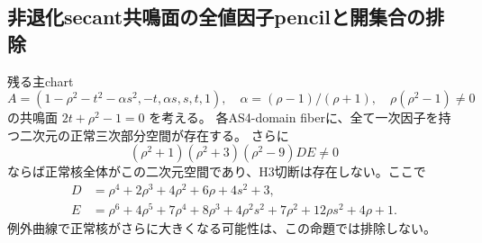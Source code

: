 \subsection{非退化secant共鳴面の全値因子pencilと開集合の排除}
\begin{proposition}
残る主chart
\[
 A=(1-\rho^2-t^2-\alpha s^2,-t,\alpha s,s,t,1),\quad
 \alpha=(\rho-1)/(\rho+1),\quad\rho(\rho^2-1)\ne0
\]
の共鳴面 $2t+\rho^2-1=0$ を考える。
各AS4-domain fiberに、全て一次因子を持つ二次元の正常三次部分空間が存在する。
さらに
\[
 (\rho^2+1)(\rho^2+3)(\rho^2-9)D E\ne0
\]
ならば正常核全体がこの二次元空間であり、H3切断は存在しない。ここで
\begin{align*}
 D&=\rho^4+2\rho^3+4\rho^2+6\rho+4s^2+3,\\
 E&=\rho^6+4\rho^5+7\rho^4+8\rho^3+4\rho^2s^2+7\rho^2+12\rho s^2+4\rho+1.
\end{align*}
例外曲線で正常核がさらに大きくなる可能性は、この命題では排除しない。
\end{proposition}
